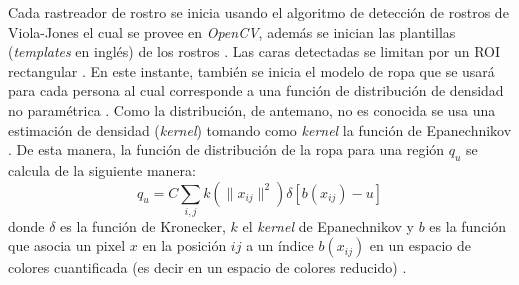 \documentclass[a4paper,openright,12pt]{report}
\begin{document}
Cada rastreador de rostro se inicia usando el algoritmo de detección de rostros
de Viola-Jones el cual se provee en \textit{OpenCV}, además se inician las
plantillas (\textit{templates} en inglés) de los rostros \cite{shaik2007robust}. Las caras detectadas
se limitan por un ROI rectangular \cite{shaik2007robust}. En este instante, también se inicia el modelo
de ropa que se usará para cada persona al cual corresponde a una función de
distribución de densidad no paramétrica \cite{shaik2007robust}. Como la distribución, de antemano, no
es conocida se usa una estimación de densidad (\textit{kernel}) tomando como
\textit{kernel} la función de Epanechnikov \cite{shaik2007robust}. De esta manera, la función de
distribución de la ropa para una región $q_{u}$ se calcula de la siguiente
manera:
\[
    q_{u} = C{\sum_{i,j} k(\lVert x_{ij} \rVert^2)\delta[b(x_{ij}) - u]}
\]
donde $\delta$ es la función de Kronecker, $k$ el \textit{kernel} de
Epanechnikov y $b$ es la función que asocia un pixel $x$ en la posición $ij$
a un índice $b(x_{ij})$ en un espacio de colores cuantificada (es decir en un
espacio de colores reducido) \cite{shaik2007robust}.\\
\end{document}
